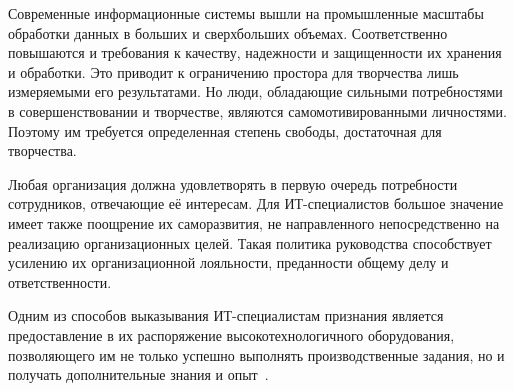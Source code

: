 \documentclass{../industrial-development}
\begin{document}
Современные информационные системы вышли на промышленные масштабы обработки данных в больших и сверхбольших объемах. Соответственно повышаются и требования к качеству, надежности и защищенности их хранения и обработки. Это приводит к ограничению простора для творчества лишь измеряемыми его результатами. Но люди, обладающие сильными потребностями в совершенствовании и творчестве, являются самомотивированными личностями. Поэтому им требуется определенная степень свободы, достаточная для творчества.

Любая организация должна удовлетворять в первую очередь потребности сотрудников, отвечающие её интересам. Для ИТ-специалистов большое значение имеет также поощрение их саморазвития, не направленного непосредственно на реализацию организационных целей. Такая политика руководства способствует усилению их организационной лояльности, преданности общему делу и ответственности.

Одним из способов выказывания ИТ-специалистам признания является предоставление в их распоряжение высокотехнологичного оборудования, позволяющего им не только успешно выполнять производственные задания, но и получать дополнительные знания и опыт~\cite{Hahalin}.
\end{document}
